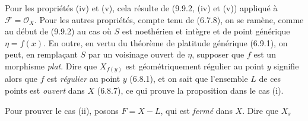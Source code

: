 Pour les propriétés (iv) et (v), cela résulte de (9.9.2, (iv) et (v)) appliqué à
$\mathcal F=\mathcal O_X$. Pour les autres propriétés, compte tenu de (6.7.8),
on se ramène, comme au début de (9.9.2) au cas où $S$ est noethérien et intègre
et de point générique $\eta=f(x)$. En outre, en vertu du théorème de platitude
générique (6.9.1), on peut, en remplaçant $S$ par un voisinage ouvert de
$\eta$, supposer que $f$ est un morphisme \emph{plat}. Dire que $X_{f(y)}$ est
géométriquement régulier au point $y$ signifie alors que $f$ est
\emph{régulier} au point $y$ (6.8.1), et on sait que l'ensemble $L$ de ces
points est \emph{ouvert} dans $X$ (6.8.7), ce qui prouve la proposition dans le
cas (i).

Pour prouver le cas (ii), posons $F=X-L$, qui est \emph{fermé} dans $X$. Dire
que $X_s$

